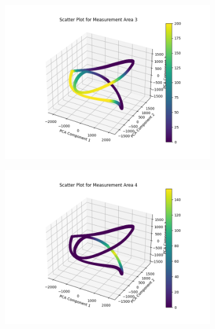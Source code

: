 \begin{itemize}
\begin{figure}[H]
\begin{subfigure}{0.33\textwidth}
        \includegraphics[width=\linewidth]
        {images/task5_2_3.png}
        \label{task5_2_3}
    \end{subfigure}
    \begin{subfigure}{0.3\textwidth}
        \includegraphics[width=\linewidth]
        {images/task5_2_4.png}
        \label{task5_2_4}
    \end{subfigure}
    \begin{subfigure}{0.3\textwidth}

\end{subfigure}
\end{figure}
\end{itemize}
